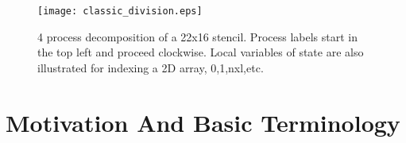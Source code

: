 
\newcommand{\nxl}{\textup{\textsf{nxl}}} %
\newcommand{\nyl}{\textup{\textsf{nyl}}} %
\newcommand{\tm}{ \text{$t_{max}$} }
\newcommand{\av}{ \mathbf{a} }
\newcommand{\uv}{ \mathbf{u} }
\newcommand{\bv}{ \mathbf{b} }
\newcommand{\pv}{ \mathbf{p} }
\newcommand{\orig} {\mathcal{O}}

\newcommand{\rnt}{ R_{-\theta} }
\newcommand{\rt}{ R_{\theta} }

\newcommand{\la}{\leftarrow} %
\newcommand{\ra}{\rightarrow} %

\newcommand{\dx}{\textsf{dx}}
\newcommand{\dy}{\textsf{dy}}

\newcommand{\data}{\textup{\textsf{data}}}
\newcommand{\psendf}{\textit{postSend}}
\newcommand{\precvf}{\textit{postRecv}}
\newcommand{\psend}[2]{\psendf(#1,#2)}
\newcommand{\precv}[2]{\precvf(#1,#2)}
\newcommand{\pid}{\textup{\textsf{pid}}} %


\begin{figure}[t]
    \centering
    \texttt{[image: classic\_division.eps]}
    \caption{4 process decomposition of a 22x16 stencil.  Process labels start in the top left and proceed clockwise.  Local
    variables of state are also illustrated for indexing a 2D array, 0,1,\nxl,etc.}
    \label{fig:basic}
\end{figure}

\section{Motivation And Basic Terminology}\label{sec:problem_statement}

